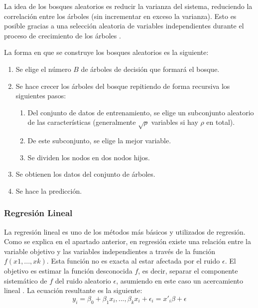 \documentclass[12pt,a4paper,Spanish]{article}
\begin{document}
La idea de los bosques aleatorios es reducir la varianza del sistema, reduciendo la correlación entre los árboles (sin incrementar en exceso la varianza). Esto es posible gracias a una selección aleatoria de variables independientes durante el proceso de crecimiento de los árboles \cite{hastie2009elements}.
\newline

La forma en que se construye los bosques aleatorios es la siguiente:
\begin{enumerate}
	\item Se elige el número $B$ de árboles de decisión que formará el bosque.
	\item Se hace crecer los árboles del bosque repitiendo de forma recursiva los siguientes pasos:
	\begin{enumerate}
		\item Del conjunto de datos de entrenamiento, se elige un subconjunto aleatorio de las características (generalmente $\sqrt{\rho}$ variables si hay $\rho$ en total).
		\item De este subconjunto, se elige la mejor variable.
		\item Se dividen los nodos en dos nodos hijos.
	\end{enumerate}
	\item Se obtienen los datos del conjunto de árboles.
	\item Se hace la predicción.
\end{enumerate}


\subsubsection{Regresión Lineal}
La regresión lineal es uno de los métodos más básicos y  utilizados de regresión. Como se explica en el apartado anterior, en regresión existe una relación entre la variable objetivo y las variables independientes a través de la función $f(x1, ..., xk)$. Esta función no es exacta al estar afectada por el ruido $\epsilon$. El objetivo es estimar la función desconocida $f$, es decir, separar el componente sistemático de $f$ del ruido aleatorio $\epsilon$, asumiendo en este caso un acercamiento lineal \cite{fahrmeir2013regression}. La ecuación resultante es la siguiente:
\begin{equation}
	y_i = 
	\beta_0 + \beta_1x_i, ..., \beta_kx_i + \epsilon_i = 
	 x'_i\beta + \epsilon 
\end{equation}
 
\end{document}
